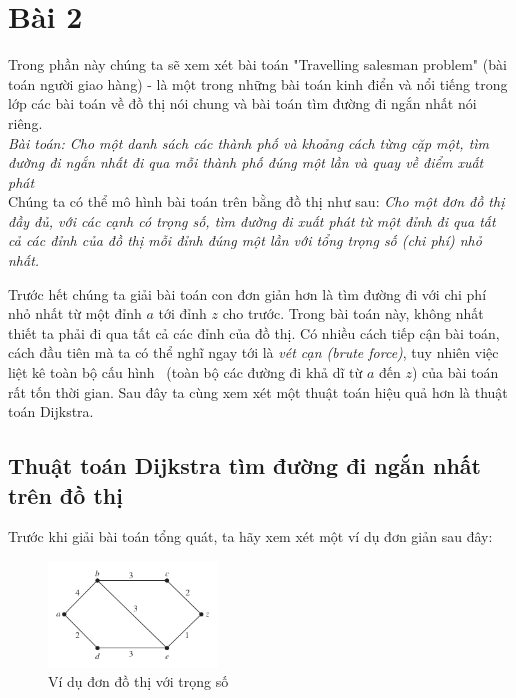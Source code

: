 \section{Bài 2}
Trong phần này chúng ta sẽ xem xét bài toán "Travelling salesman problem" (bài toán 
người giao hàng) - là một trong những bài toán kinh điển và nổi tiếng trong lớp các
bài toán về đồ thị nói chung và bài toán tìm đường đi ngắn nhất nói riêng. \\

\textit{Bài toán: Cho một danh sách các thành phố và khoảng cách từng cặp một, 
tìm đường đi ngắn nhất đi qua mỗi thành phố đúng một lần và quay về điểm xuất phát} \\


Chúng ta có thể mô hình bài toán trên bằng đồ thị như sau: \textit{Cho một đơn đồ thị đầy đủ, 
với các cạnh có trọng số, tìm đường đi xuất phát từ một đỉnh đi qua tất cả các đỉnh 
của đồ thị mỗi đỉnh đúng một lần với tổng trọng số (chi phí) nhỏ nhất.}

Trước hết chúng ta giải bài toán con đơn giản hơn là tìm đường đi với chi phí nhỏ nhất từ
một đỉnh $a$ tới đỉnh $z$ cho trước. Trong bài toán này, không nhất thiết ta phải đi qua 
tất cả các đỉnh của đồ thị. Có nhiều cách tiếp cận bài toán, cách đầu tiên mà ta có thể nghĩ 
ngay tới là \textit{vét cạn (brute force)}, tuy nhiên việc liệt kê toàn bộ cấu hình \
(toàn bộ các đường đi khả dĩ từ $a$ đến $z$) của bài toán rất tốn thời gian. Sau đây ta cùng
xem xét một thuật toán hiệu quả hơn là thuật toán Dijkstra.

\subsection{Thuật toán Dijkstra tìm đường đi ngắn nhất trên đồ thị}
Trước khi giải bài toán tổng quát, ta hãy xem xét một ví dụ đơn giản sau đây:

\begin{figure}[H] %
    \centering %
    \includegraphics[width=0.4\textwidth]{assets/gr_01.png} 
    \caption{Ví dụ đơn đồ thị với trọng số } %
    \label{fig:gr_01}
\end{figure}

